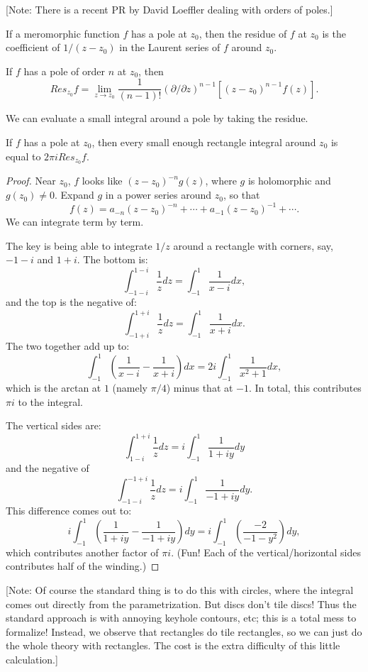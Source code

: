 [Note: There is a recent PR by David Loeffler dealing with orders of poles.]



If a meromorphic function $f$ has a pole at $z_0$, then the residue of $f$ at $z_0$ is the coefficient of $1/(z-z_0)$ in the Laurent series of $f$ around $z_0$.
\begin{definition}\label{Residue}
If $f$ has a pole of order $n$ at $z_0$, then
$$
Res_{z_0} f = \lim_{z\to z_0}\frac1{(n-1)!}(\partial/\partial z)^{n-1}[(z-z_0)^{n-1}f(z)].
$$
\end{definition}



We can evaluate a small integral around a pole by taking the residue.
\begin{theorem}\label{ResidueTheoremOnRectangle}
If $f$ has a pole at $z_0$, then every small enough rectangle integral around $z_0$ is equal to $2\pi i Res_{z_0} f$.
\end{theorem}



\begin{proof}
Near $z_0$, $f$ looks like $(z-z_0)^{-n} g(z)$, where $g$ is holomorphic and $g(z_0) \neq 0$.
Expand $g$ in a power series around $z_0$, so that
$$
f(z) = a_{-n}(z-z_0)^{-n} + \cdots + a_{-1}(z-z_0)^{-1} + \cdots.
$$
We can integrate term by term.

The key is being able to integrate $1/z$ around a rectangle with corners, say, $-1-i$ and $1+i$. The bottom is:
$$
\int_{-1-i}^{1-i} \frac1z dz
=
\int_{-1}^1 \frac1{x-i} dx,
$$
and the top is the negative of:
$$
\int_{-1+i}^{1+i} \frac1z dz
=
\int_{-1}^1 \frac1{x+i} dx.
$$
The two together add up to:
$$
\int_{-1}^1
\left(\frac1{x-i}-\frac1{x+i} \right)dx
=
2i\int_{-1}^1
\frac{1}{x^2+1}dx,
$$
which is the arctan at $1$ (namely $\pi/4$) minus that at $-1$. In total, this contributes $\pi i$ to the integral.

The vertical sides are:
$$
\int_{1-i}^{1+i} \frac1z dz
=
i\int_{-1}^1 \frac1{1+iy} dy
$$
and the negative of
$$
\int_{-1-i}^{-1+i} \frac1z dz
=
i\int_{-1}^1 \frac1{-1+iy} dy.
$$
This difference comes out to:
$$
i\int_{-1}^1 \left(\frac1{1+iy}-\frac1{-1+iy}\right) dy
=
i\int_{-1}^1 \left(\frac{-2}{-1-y^2}\right) dy,
$$
which contributes another factor of $\pi i$. (Fun! Each of the vertical/horizontal sides contributes half of the winding.)
\end{proof}

[Note: Of course the standard thing is to do this with circles, where the integral comes out directly from the parametrization. But discs don't tile
discs! Thus the standard approach is with annoying keyhole contours, etc; this is a total mess to formalize! Instead, we observe that rectangles do tile rectangles, so we can just do the
whole theory with rectangles. The cost is the extra difficulty of this little calculation.]

